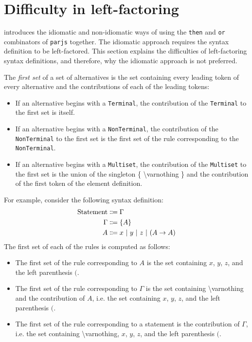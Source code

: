 \section{Difficulty in left-factoring}
\label{syntax:factorisation}
 introduces the idiomatic and non-idiomatic ways of using the \lstinline{then} and \lstinline{or} combinators of \lstinline{parjs} together. The idiomatic approach requires the syntax definition to be left-factored. This section explains the difficulties of left-factoring syntax definitions, and therefore, why the idiomatic approach is not preferred.

The \textit{first set} of a set of alternatives is the set containing every leading token of every alternative and the contributions of each of the leading tokens:
\begin{itemize}
    \item If an alternative begins with a \lstinline{Terminal}, the contribution of the \lstinline{Terminal} to the first set is itself.
    \item If an alternative begins with a \lstinline{NonTerminal}, the contribution of the \lstinline{NonTerminal} to the first set is the first set of the rule corresponding to the \lstinline{NonTerminal}.
    \item If an alternative begins with a \lstinline{Multiset}, the contribution of the \lstinline{Multiset} to the first set is the union of the singleton \{ \textbackslash varnothing \} and the contribution of the first token of the element definition.
\end{itemize}

For example, consider the following syntax definition:
\begin{align*}
    \text{Statement} &\Coloneqq \Gamma \\
    \Gamma &\Coloneqq \{ A \} \\
    A &\Coloneqq x \ |\  y \ |\  z \ |\  (A \to A)
\end{align*}
The first set of each of the rules is computed as follows:
\begin{itemize}
    \item The first set of the rule corresponding to $A$ is the set containing $x$, $y$, $z$, and the left parenthesis $($.
    \item The first set of the rule corresponding to $\Gamma$ is the set containing \textbackslash varnothing and the contribution of $A$, i.e. the set containing $x$, $y$, $z$, and the left parenthesis $($.
    \item The first set of the rule corresponding to a statement is the contribution of $\Gamma$, i.e. the set containing \textbackslash varnothing, $x$, $y$, $z$, and the left parenthesis $($.
\end{itemize}


